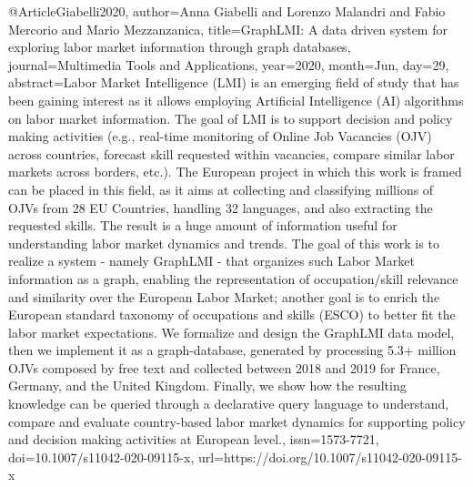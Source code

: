 {@Article{Giabelli2020,
author={Anna Giabelli and Lorenzo Malandri and Fabio Mercorio and  Mario Mezzanzanica},
title={GraphLMI: A data driven system for exploring labor market information through graph databases},
journal={Multimedia Tools and Applications},
year={2020},
month={Jun},
day={29},
abstract={Labor Market Intelligence (LMI) is an emerging field of study that has been gaining interest as it allows employing Artificial Intelligence (AI) algorithms on labor market information. The goal of LMI is to support decision and policy making activities (e.g., real-time monitoring of Online Job Vacancies (OJV) across countries, forecast skill requested within vacancies, compare similar labor markets across borders, etc.). The European project in which this work is framed can be placed in this field, as it aims at collecting and classifying millions of OJVs from 28 EU Countries, handling 32 languages, and also extracting the requested skills. The result is a huge amount of information useful for understanding labor market dynamics and trends. The goal of this work is to realize a system - namely GraphLMI - that organizes such Labor Market information as a graph, enabling the representation of occupation/skill relevance and similarity over the European Labor Market; another goal is to enrich the European standard taxonomy of occupations and skills (ESCO) to better fit the labor market expectations. We formalize and design the GraphLMI data model, then we implement it as a graph-database, generated by processing 5.3+ million OJVs composed by free text and collected between 2018 and 2019 for France, Germany, and the United Kingdom. Finally, we show how the resulting knowledge can be queried through a declarative query language to understand, compare and evaluate country-based labor market dynamics for supporting policy and decision making activities at European level.},
issn={1573-7721},
doi={10.1007/s11042-020-09115-x},
url={https://doi.org/10.1007/s11042-020-09115-x}
}


}
